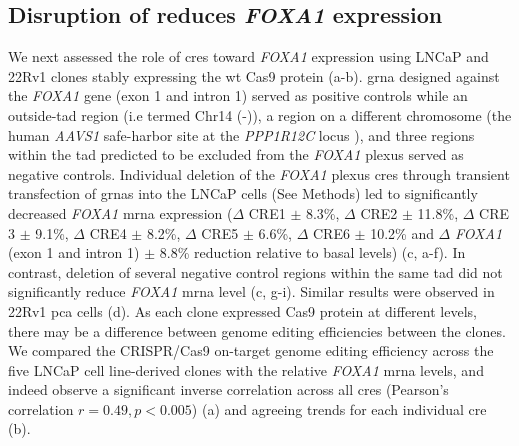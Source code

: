 
\subsection{Disruption of  reduces \emph{FOXA1}  expression}

We next assessed the role of \glspl{cre} toward \emph{FOXA1} expression using LNCaP and 22Rv1 clones stably expressing the \gls{wt} Cas9 protein (a-b).
\Gls{grna} designed against the \emph{FOXA1} gene (exon 1 and intron 1) served as positive controls while an outside-\gls{tad} region (i.e termed Chr14 (-)), a region on a different chromosome (the human \emph{AAVS1} safe-harbor site at the \emph{PPP1R12C} locus \cite{kronTMPRSS2ERGFusion2017,dekelverFunctionalGenomicsProteomics2010}), and three regions within the \gls{tad} predicted to be excluded from the \emph{FOXA1} plexus served as negative controls.
Individual deletion of the \emph{FOXA1} plexus \glspl{cre} through transient transfection of \glspl{grna} into the LNCaP cells (See Methods) led to significantly decreased \emph{FOXA1} \gls{mrna} expression ($\Delta$ CRE1  $\pm$ 8.3\%, $\Delta$ CRE2  $\pm$ 11.8\%, $\Delta$ CRE 3  $\pm$ 9.1\%, $\Delta$ CRE4  $\pm$ 8.2\%, $\Delta$ CRE5  $\pm$ 6.6\%, $\Delta$ CRE6  $\pm$ 10.2\% and $\Delta$ \emph{FOXA1} (exon 1 and intron 1)  $\pm$ 8.8\% reduction relative to basal levels) (c, a-f).
In contrast, deletion of several negative control regions within the same \gls{tad} did not significantly reduce \emph{FOXA1} \gls{mrna} level (c, g-i).
Similar results were observed in 22Rv1 \gls{pca} cells (d).
As each clone expressed Cas9 protein at different levels, there may be a difference between genome editing efficiencies between the clones.
We compared the CRISPR/Cas9 on-target genome editing efficiency across the five LNCaP cell line-derived clones with the relative \emph{FOXA1} \gls{mrna} levels, and indeed observe a significant inverse correlation across all \glspl{cre} (Pearson's correlation $r = 0.49, p < 0.005$) (a) and agreeing trends for each individual \gls{cre} (b).

